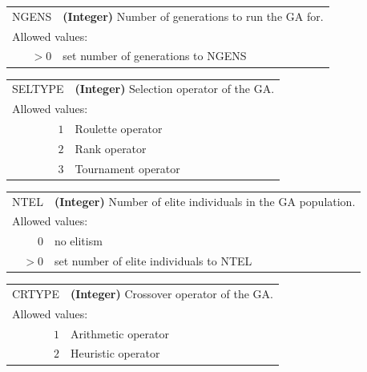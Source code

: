 \documentclass[10pt,a4paper]{report}
\numberwithin{equation}{section}
\begin{document}
{
\begin{tabular}{r@{ : }l}
\label{descr:ngens}
     NGENS&\textbf{(Integer)} Number of generations to run the GA for.                                                             \\ 
\multicolumn{2}{l}{Allowed values:} \\ 
    \(>0\)&set number of generations to NGENS                                                                   \\ 
\end{tabular}
\vspace{1ex}
}

{
\begin{tabular}{r@{ : }l}
\label{descr:seltype}
   SELTYPE&\textbf{(Integer)} Selection operator of the GA.                                                                        \\ 
\multicolumn{2}{l}{Allowed values:} \\ 
     \(1\)&Roulette operator                                                                                    \\ 
     \(2\)&Rank operator                                                                                        \\ 
     \(3\)&Tournament operator                                                                                  \\ 
\end{tabular}
\vspace{1ex}
}

{
\begin{tabular}{r@{ : }l}
\label{descr:ntel}
      NTEL&\textbf{(Integer)} Number of elite individuals in the GA population.                                                    \\ 
\multicolumn{2}{l}{Allowed values:} \\ 
     \(0\)&no elitism                                                                                           \\ 
    \(>0\)&set number of elite individuals to NTEL                                                              \\ 
\end{tabular}
\vspace{1ex}
}

{
\begin{tabular}{r@{ : }l}
\label{descr:crtype}
    CRTYPE&\textbf{(Integer)} Crossover operator of the GA.                                                                       \\ 
\multicolumn{2}{l}{Allowed values:} \\ 
     \(1\)&Arithmetic operator                                                                                  \\ 
     \(2\)&Heuristic operator                                                                                   \\ 
\end{tabular}
\vspace{1ex}
}
\end{document}
